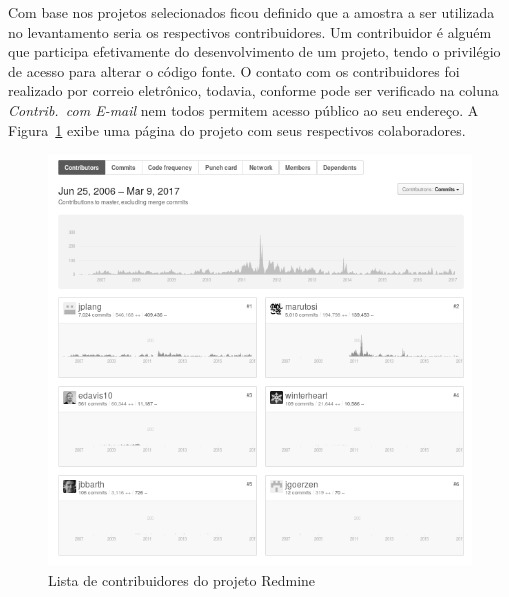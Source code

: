\begin{table}[htpb]
\centering
{}
\caption{Projetos utilizados no levantamento com profissionais. Os dados
	apresentados tem como referência 07/03/2017.}
\label{tab:projetos_utilizados_para_avaliacao}
\end{table}

Com base nos projetos selecionados ficou definido que a amostra a ser utilizada
no levantamento seria os respectivos contribuidores. Um contribuidor é alguém
que participa efetivamente do desenvolvimento de um projeto, tendo o privilégio
de acesso para alterar o código fonte. O contato com os contribuidores foi
realizado por correio eletrônico, todavia, conforme pode ser verificado na
coluna \textit{Contrib.\ com E-mail} nem todos permitem acesso público ao seu
endereço. A Figura~\ref{fig:redmine_contribuidores} exibe uma página do projeto
com seus respectivos colaboradores.

\begin{figure}[htpb]
	\centering
	\includegraphics[width=0.8\linewidth]{./chapter-sugestoes-melhorias-fgrm/img/redmine_contribuidores.png}
	\caption{Lista de contribuidores do projeto Redmine}
\label{fig:redmine_contribuidores}
\end{figure}


